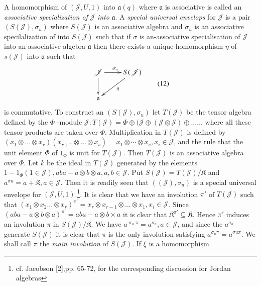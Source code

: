 A homomorphism of
$(\mathscr{J},U,1)$ into $\mathfrak{a}(q)$ where $\mathfrak{a}$ is
associative is called an {\em associative specialization of}
$\mathscr{J}$ {\em into} $\mathfrak{a}$. A {\em special universal
  envelops} for $\mathscr{J}$ is a pair $(S(\mathscr{J}),\sigma_u)$
where $S(\mathscr{J})$ is an associative algebra and $\sigma_u$ is an
associative specilalization of into $S(\mathscr{J})$ such that if
$\sigma$ is an-associative specialisation of
$\mathscr{J}$\pageoriginale into an associative algebra $\mathfrak{a}$
then there exists a unique homomorphism $\eta$ of $s(\mathscr{J})$
into $\mathfrak{a}$ such that
\begin{equation*}
\vcenter{\xymatrix{
\mathscr{J}\ar[d]\ar[r]^{\sigma_u}& S(\mathscr{J})\ar[dl]^{\eta}\\
\mathfrak{a}
}}\tag{12}
\end{equation*}
is commutative. To construct an $(S(\mathscr{J}),\sigma_u)$ let
$T(\mathscr{J})$ be the tensor algebra defined by the $\Phi$ -module
$\mathscr{J}:T(\mathscr{J})=\Phi\oplus(\mathscr{J}\oplus(\mathscr{J}\otimes\mathscr{J})\oplus\ldots\ldots$ 
where all these tensor products are taken over $\Phi$. Multiplication
in $T(\mathscr{J})$ is defined by $(x_1\otimes\ldots\otimes
x_r)(x_{r+1}\otimes\ldots \otimes x_s)=x_1\otimes\cdots\otimes
x_s,x_i\in \mathscr{J}$, and the rule that the unit element
$\Phi$ of $1_\Phi$ is unit for $T(\mathscr{J})$. Then $T(\mathscr{J})$
is an associative algebra over $\Phi$. Let $k$ be the ideal in
$T(\mathscr{J})$ generated by the elements $1-1_{\Phi}(1\in
\mathscr{J}), aba-a\otimes b\otimes a, a,b\in \mathscr{J}$. Put
$S(\mathscr{J})=T(\mathscr{J})/\mathfrak{K}$ and $a^{\sigma
  u}=a+\mathfrak{K},a\in \mathscr{J}$. Then it is readily seen
that $((\mathscr{J}),\sigma_u)$ is a special universal envelope for
$(\mathscr{J},U,1)$.\footnote{cf. Jacobson [2],pp. 65-72, for the
  corresponding discussion for Jordan algebras}. It is clear that we
have an involution 
$\pi'$ of $T(\mathscr{J})$ such that $(x_1\otimes x_2\ldots \otimes
x_r)^{\pi'}=x_r\otimes x_{r-1}\otimes\ldots \otimes x_1,x_i\in
\mathscr{J}$. Since $(aba-a\otimes b\otimes a)^{\pi'}=aba-a\otimes
b\times a$ it is clear that $\mathfrak{K}^{\pi'}\subseteq
\mathfrak{K}$. Hence $\pi'$ induces an involution $\pi$ in
$S(\mathscr{J})/\mathfrak{K}$. We have
$\displaystyle{a^{\mathop{\sigma}_u \pi} =a^{\sigma_
  u}, a\in \mathscr{J}}$, and since the $a^{\sigma_u}$ generate
$S(\mathscr{J})$ it is clear that $\pi$ is the only involution
satisfying $a^{\sigma_u\pi}=a^{\sigma u \pi}$. We shall call $\pi$ the
{\em main involution} of $S(\mathscr{J})$. If $\xi$ is a homomorphism
